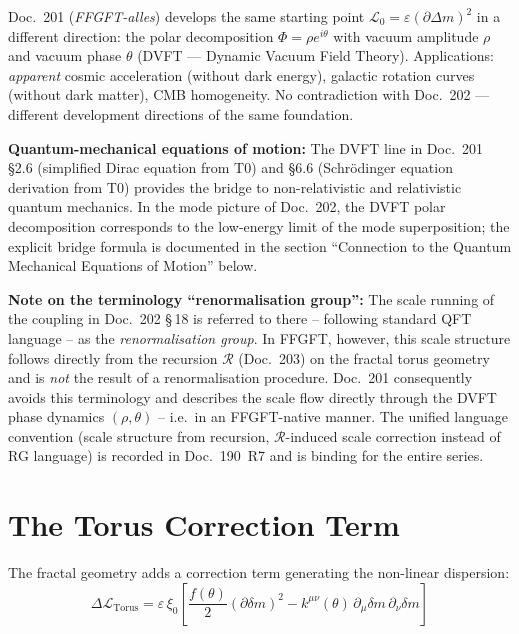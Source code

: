 \begin{tcolorbox}[colback=gray!5, colframe=gray!50!black, boxrule=0.5pt,
  arc=2pt, left=3mm, right=3mm, fontupper=\small,
  title={Related document: Doc.~201 (DVFT adaptation)}]
Doc.~201 (\textit{FFGFT-alles}) develops the same starting point
$\mathcal{L}_0 = \varepsilon(\partial\Delta m)^2$ in a different
direction: the polar decomposition $\Phi = \rho e^{i\theta}$ with
vacuum amplitude $\rho$ and vacuum phase $\theta$ (DVFT ---
Dynamic Vacuum Field Theory). Applications: \textit{apparent} cosmic acceleration
(without dark energy), galactic rotation curves
(without dark matter), CMB homogeneity. No contradiction with Doc.~202 ---
different development directions of the same foundation.

\medskip

\textbf{Quantum-mechanical equations of motion:} The DVFT line in
Doc.~201 \S 2.6 (simplified Dirac equation from T0) and \S 6.6
(Schrödinger equation derivation from T0) provides the bridge to
non-relativistic and relativistic quantum mechanics. In the mode
picture of Doc.~202, the DVFT polar decomposition corresponds to the
low-energy limit of the mode superposition; the explicit bridge
formula is documented in the section
\enquote{Connection to the Quantum Mechanical Equations of Motion}
below.

\medskip

\textbf{Note on the terminology \enquote{renormalisation group}:}
The scale running of the coupling in Doc.~202 \S\,18 is referred to
there -- following standard QFT language -- as the
\emph{renormalisation group}. In FFGFT, however, this scale
structure follows directly from the recursion $\mathcal{R}$
(Doc.~203) on the fractal torus geometry and is \emph{not} the
result of a renormalisation procedure. Doc.~201 consequently
avoids this terminology and describes the scale flow directly
through the DVFT phase dynamics $(\rho, \theta)$ -- i.e.\ in an
FFGFT-native manner. The unified language convention (scale
structure from recursion, $\mathcal{R}$-induced scale correction
instead of RG language) is recorded in Doc.~190~R7 and is binding
for the entire series.
\end{tcolorbox}

\section{The Torus Correction Term}

The fractal geometry adds a correction term generating the non-linear dispersion:
\begin{equation}
  \Delta\mathcal{L}_{\text{Torus}}
  = \varepsilon\,\xi_0\!\left[
    \frac{f(\theta)}{2}(\partial\delta m)^2
    - k^{\mu\nu}(\theta)\,\partial_\mu\delta m\,\partial_\nu\delta m
    \right]
\end{equation}

